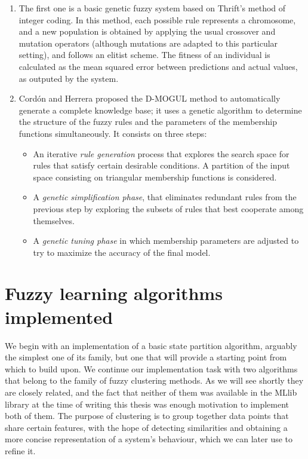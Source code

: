 \begin{enumerate}[1.]
  \item The first one is a basic genetic fuzzy system based on Thrift's method \cite{thrift1991genetic} of integer coding. In this method, each possible rule represents a chromosome, and a new population is obtained by applying the usual crossover and mutation operators (although mutations are adapted to this particular setting), and follows an elitist scheme. The fitness of an individual is calculated as the mean squared error between predictions and actual values, as outputed by the system.
  \item Cordón and Herrera proposed the D-MOGUL method \cite{cordon1997three} to automatically generate a complete knowledge base; it uses a genetic algorithm to determine the structure of the fuzzy rules and the parameters of the membership functions simultaneously. It consists on three steps:
  \begin{itemize}
    \item An iterative \textit{rule generation} process that explores the search space for rules that satisfy certain desirable conditions. A partition of the input space consisting on triangular membership functions is considered.
    \item A \textit{genetic simplification phase}, that eliminates redundant rules from the previous step by exploring the subsets of rules that best cooperate among themselves.
    \item A \textit{genetic tuning phase} in which membership parameters are adjusted to try to maximize the accuracy of the final model.
  \end{itemize}
\end{enumerate}

\section{Fuzzy learning algorithms implemented}

We begin with an implementation of a basic state partition algorithm, arguably the simplest one of its family, but one that will provide a starting point from which to build upon. We continue our implementation task with two algorithms that belong to the family of fuzzy clustering methods. As we will see shortly they are closely related, and the fact that neither of them was available in the MLlib library at the time of writing this thesis was enough motivation to implement both of them. The purpose of clustering is to group together data points that share certain features, with the hope of detecting similarities and obtaining a more concise representation of a system's behaviour, which we can later use to refine it.

